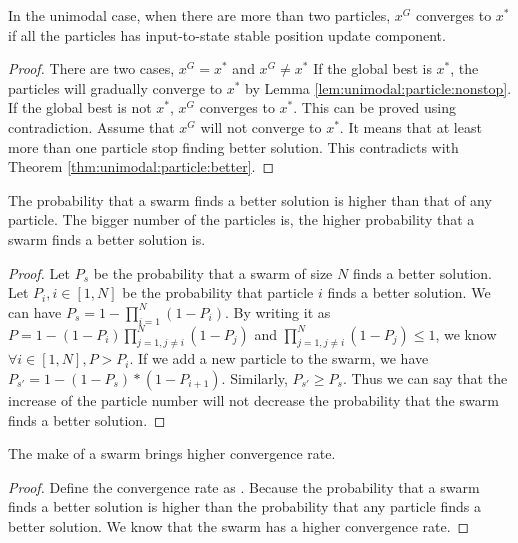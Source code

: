 \begin{mythm}
\label{thm:unimodal:swarm:converge}
In the unimodal case, when there are more than two particles, $ x^{G} $ converges to $ x^{*} $ if all the particles has input-to-state stable position update component.
\begin{proof}
There are two cases, $ x^{G} = x^{*} $ and $ x^{G} \not = x^{*} $
If the global best is $ x^{*} $, the particles will gradually converge to $ x^{*} $ by Lemma \ref{lem:unimodal:particle:nonstop}.
If the global best is not $ x^{*} $, $ x^{G} $ converges to $ x^{*} $.
This can be proved using contradiction.
Assume that $ x^{G} $ will not converge to $ x^{*} $.
It means that at least more than one particle stop finding better solution.
This contradicts with Theorem \ref{thm:unimodal:particle:better}.
\end{proof}
\end{mythm}



\begin{mylem}
The probability that a swarm finds a better solution is higher than that of any particle.
The bigger number of the particles is, the higher probability that a swarm finds a better solution is.
\begin{proof}
Let $ P_{s} $ be the probability that a swarm of size $ N $ finds a better solution.
Let $ P_{i}, i \in [1, N] $ be the probability that particle $ i $ finds a better solution.
We can have  $ P_{s} = 1 - \prod_{i=1}^{N} ( 1 - P_{i} ) $.
By writing it as $ P = 1 - ( 1 - P_{i} ) \prod_{j=1, j \not = i}^{N}  ( 1 - P_{j} ) $ and $ \prod_{j=1, j \not = i}^{N}  ( 1 - P_{j} ) \leq 1 $, we know $ \forall i \in [1, N], P > P_{i} $.
If we add a new particle to the swarm, we have
$ P_{s'}  = 1 - (1- P_{s}) *(1-P_{i+1}) $. 
Similarly, $ P_{s'} \geq P_{s} $.
Thus we can say that the increase of the particle number will not decrease the probability that the swarm finds a better solution.
\end{proof}
\end{mylem}

\begin{mythm}
The make of a swarm brings higher convergence rate.
\begin{proof}
Define the convergence rate as $ $.
Because the probability that a swarm finds a better solution is higher than the probability that any particle finds a better solution.
We know that the swarm has a higher convergence rate.
\end{proof}
\end{mythm}


